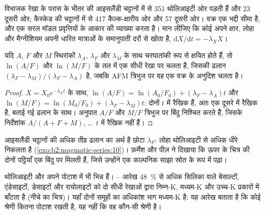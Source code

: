 विभाजक रेखा के परास के भीतर की आइसलैंडी चट्टानों में से 351
थोलिआइटी ओर पड़ती हैं और 23 दूसरी ओर; कैस्केड की चट्टानों में से 417 कैल्क-क्षारीय
ओर और 57 दूसरी ओर। वक्र एक भद्दी सीमा है, और एक सरल मॉडल
प्रवृत्तियों के आकार की व्याख्या करता है। मान लीजिए कि कोई  अपने क्षार, लोहा और मैग्नीशियम
अपनी धारित मात्राओं के समानुपाती दरों से खोता है, $\mathrm dX/\mathrm dt = -\lambda_X X$।

\begin{proposition}[लघुगणकीय-अनुपात प्रवृत्तियाँ]\label{prop:b2:magmatic-series:logratio}
यदि $A$, $F$ और $M$ स्थिरांकों $\lambda_A$, $\lambda_F$ और
$\lambda_M$ के साथ चरघातांकी रूप से क्षयित होते हैं, तो  $\ln(A/F)$ और
$\ln(M/F)$ के तल में एक सीधी रेखा पर चलता है, जिसकी ढलान $(\lambda_F - \lambda_M)/(\lambda_F - \lambda_A)$ है, जबकि
AFM त्रिभुज पर वह एक वक्र के अनुदिश चलता है।
\end{proposition}

\begin{proof}
$X = X_0 e^{-\lambda_X t}$ के साथ, $\ln(A/F) = \ln(A_0/F_0) + (\lambda_F - \lambda_A)t$
और $\ln(M/F) = \ln(M_0/F_0) + (\lambda_F - \lambda_M)t$: दोनों $t$ में रैखिक हैं, अतः
एक दूसरे में रैखिक है, बताई गई ढलान के साथ। अनुपात $A/F$ और $M/F$ त्रिभुज पर
बिंदु निश्चित करते हैं, जिसके निर्देशांक $A/(A + F + M)$, \dots\ $t$ में रैखिक नहीं हैं।
\end{proof}

आइसलैंडी चट्टानों की अधिक तीव्र ढलान का अर्थ है छोटा $\lambda_F$: लोहा
थोलिआइटी  से अधिक धीरे निकलता है (\cref{exo:b2:magmatic-series:10})। फ़र्मेश और पीज़ ने दिखाया कि ऊपर के चित्र की दोनों
पट्टियाँ एक बिंदु पर मिलती हैं, जिसे उन्होंने एक काल्पनिक साझा
स्रोत के रूप में पढ़ा।

थोलिआइटी और  अपने पोटाश में भी भिन्न हैं।
-- आरेख \qty{48}{\percent} से अधिक सिलिका वाले बेसाल्टों, एंडेसाइटों, डेसाइटों और रायोलाइटों को
दो सीधी रेखाओं द्वारा निम्न-K, मध्यम-K और उच्च-K प्रकारों में बाँटता है
(नीचे का चित्र)। यहाँ दोनों समूहों का अधिकांश भाग मध्यम-K है: यह
आरेख बताता है कि कोई श्रेणी कितना पोटाश रखती है, यह नहीं कि वह कौन-सी श्रेणी है।

